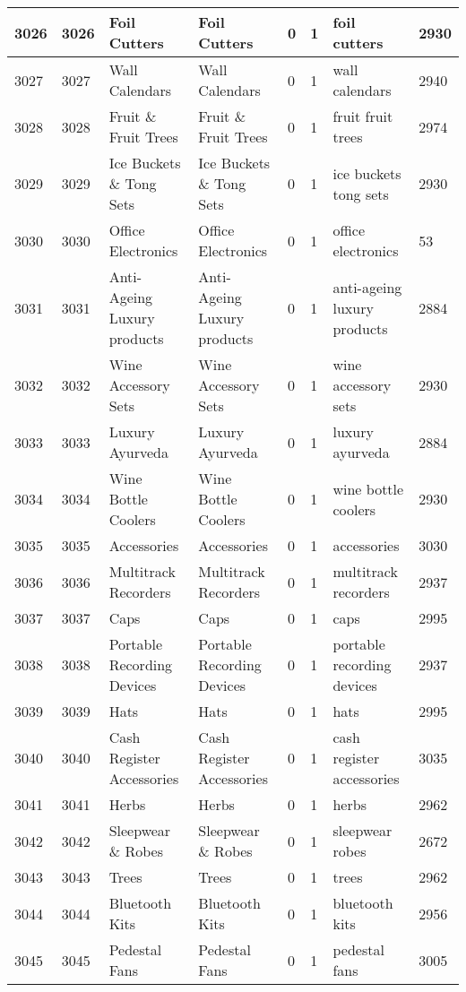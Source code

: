 \begin{longtable}{|l|l|l|l|l|l|l|l|}
3026 & 3026 & Foil Cutters & Foil Cutters & 0 & 1 & foil cutters & 2930 \\ \hline 
3027 & 3027 & Wall Calendars & Wall Calendars & 0 & 1 & wall calendars & 2940 \\ \hline 
3028 & 3028 & Fruit \& Fruit Trees & Fruit \& Fruit Trees & 0 & 1 & fruit fruit trees & 2974 \\ \hline 
3029 & 3029 & Ice Buckets \& Tong Sets & Ice Buckets \& Tong Sets & 0 & 1 & ice buckets tong sets & 2930 \\ \hline 
3030 & 3030 & Office Electronics & Office Electronics & 0 & 1 & office electronics & 53 \\ \hline 
3031 & 3031 & Anti-Ageing Luxury products & Anti-Ageing Luxury products & 0 & 1 & anti-ageing luxury products & 2884 \\ \hline 
3032 & 3032 & Wine Accessory Sets & Wine Accessory Sets & 0 & 1 & wine accessory sets & 2930 \\ \hline 
3033 & 3033 & Luxury Ayurveda & Luxury Ayurveda & 0 & 1 & luxury ayurveda & 2884 \\ \hline 
3034 & 3034 & Wine Bottle Coolers & Wine Bottle Coolers & 0 & 1 & wine bottle coolers & 2930 \\ \hline 
3035 & 3035 & Accessories & Accessories & 0 & 1 & accessories & 3030 \\ \hline 
3036 & 3036 & Multitrack Recorders & Multitrack Recorders & 0 & 1 & multitrack recorders & 2937 \\ \hline 
3037 & 3037 & Caps & Caps & 0 & 1 & caps & 2995 \\ \hline 
3038 & 3038 & Portable Recording Devices & Portable Recording Devices & 0 & 1 & portable recording devices & 2937 \\ \hline 
3039 & 3039 & Hats & Hats & 0 & 1 & hats & 2995 \\ \hline 
3040 & 3040 & Cash Register Accessories & Cash Register Accessories & 0 & 1 & cash register accessories & 3035 \\ \hline 
3041 & 3041 & Herbs & Herbs & 0 & 1 & herbs & 2962 \\ \hline 
3042 & 3042 & Sleepwear \& Robes & Sleepwear \& Robes & 0 & 1 & sleepwear robes & 2672 \\ \hline 
3043 & 3043 & Trees & Trees & 0 & 1 & trees & 2962 \\ \hline 
3044 & 3044 & Bluetooth Kits & Bluetooth Kits & 0 & 1 & bluetooth kits & 2956 \\ \hline 
3045 & 3045 & Pedestal Fans & Pedestal Fans & 0 & 1 & pedestal fans & 3005 \\ \hline 

\end{longtable}
